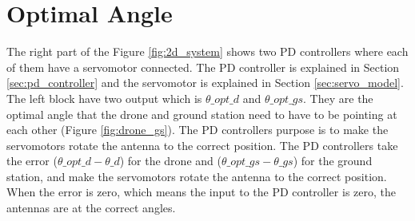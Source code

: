 \section{Optimal Angle}\label{sec:opt_angle}
The right part of the Figure \ref{fig:2d_system} shows two PD controllers where each of them have a servomotor connected. The PD controller is explained in Section \ref{sec:pd_controller} and the servomotor is explained in Section \ref{sec:servo_model}. The left block have two output which is $\theta\_opt\_d$ and $\theta\_opt\_gs$. They are the optimal angle that the drone and ground station need to have to be pointing at each other (Figure \ref{fig:drone_gs}). The PD controllers purpose is to make the servomotors rotate the antenna to the correct position. The PD controllers take the error ($\theta\_opt\_d - \theta\_d$) for the drone and ($\theta\_opt\_gs - \theta\_gs$) for the ground station, and make the servomotors rotate the antenna to the correct position. When the error is zero, which means the input to the PD controller is zero, the antennas are at the correct angles.